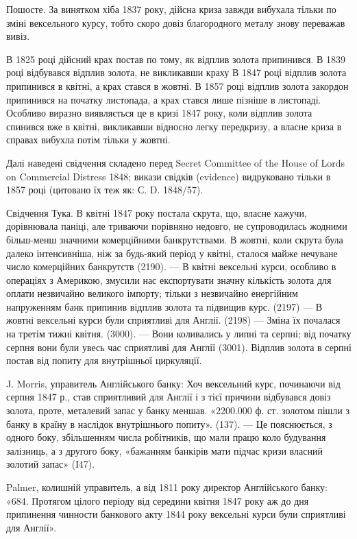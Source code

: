 Пошосте. За винятком хіба 1837 року, дійсна криза завжди вибухала
тільки по зміні вексельного курсу, тобто скоро довіз благородного металу знову
переважав вивіз.

В 1825 році дійсний крах постав по тому, як відплив золота припинився.
В 1839 році відбувався відплив золота, не викликавши краху В 1847 році
відплив золота припинився в квітні, а крах стався в жовтні. В 1857 році відплив
золота закордон припинився на початку листопада, а крах стався лише
пізніше в листопаді. Особливо виразно виявляється це в кризі 1847 року, коли
відплив золота спинився вже в квітні, викликавши відносно легку передкризу,
а власне криза в справах вибухла потім тільки у жовтні.

Далі наведені свідчення складено перед Secret Committee of the House of
Lords on Commercial Distress 1848; викази свідків (evidence) видруковано тільки
в 1857 році (цитовано їх теж як: С. D. 1848/57).

Свідчення Тука. В квітні 1847 року постала скрута, що, власне кажучи,
дорівнювала паніці, але триваючи порівняно недовго, не супроводилась жодними
більш-менш значними комерційними банкрутствами. В жовтні, коли скрута була
далеко інтенсивніша, ніж за будь-який період у квітні, сталося майже нечуване
число комерційних банкрутств (2190). — В квітні вексельні курси, особливо в операціях
з Америкою, змусили нас експортувати значну кількість золота для оплати
незвичайно великого імпорту; тільки з незвичайно енергійним напруженням банк
припинив відплив золота та підвищив курс. (2197) — В жовтні вексельні курси
були сприятливі для Англії. (2198) — Зміна їх почалася на третім тижні квітня.
(3000). — Вони коливались у липні та серпні; від початку серпня вони були
увесь час сприятливі для Англії (3001). Відплив золота в серпні постав від
попиту для внутрішньої циркуляції.

J. Morris, управитель Англійського банку: Хоч вексельний курс, починаючи
від серпня 1847 р., став сприятливий для Англії і з тієї причини відбувався довіз
золота, проте, металевий запас у банку меншав. «2200.000 ф. ст. золотом пішли
з банку в країну в наслідок внутрішнього попиту». (137). — Це пояснюється,
з одного боку, збільшенням числа робітників, що мали працю коло будування
залізниць, а з другого боку, «бажанням банкірів мати підчас кризи власний
золотий запас» (І47).

Palmer, колишній управитель, а від 1811 року директор Англійського банку:
«684. Протягом цілого періоду від середини квітня 1847 року аж до
дня припинення чинности банкового акту 1844 року вексельні курси були
сприятливі для Англії».

